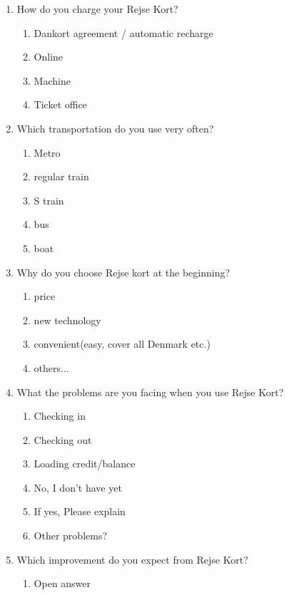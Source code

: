 \begin{enumerate}
\begin{enumerate}
\begin{enumerate}
			\item How do you charge your Rejse Kort?
				\begin{enumerate}
					\item Dankort agreement / automatic recharge
					\item Online
					\item Machine
					\item Ticket office
				\end{enumerate}
				
			\item Which transportation do you use very often?
				\begin{enumerate}
					\item Metro
					\item regular train
					\item S train
					\item bus
					\item boat
				\end{enumerate}
				
			\item Why do you choose Rejse kort at the beginning?
				\begin{enumerate}
					\item price
					\item new technology
					\item convenient(easy, cover all Denmark etc.)
					\item others...
				\end{enumerate}
				
			\item What the problems are you facing when you use Rejse Kort?
				\begin{enumerate}
					\item Checking in
					\item Checking out
					\item Loading credit/balance
					\item No, I don’t have yet
					\item If yes, Please explain
					\item Other problems?
				\end{enumerate}
				
			\item Which improvement  do you expect from Rejse Kort?
				\begin{enumerate}
					\item Open answer
				\end{enumerate}	
		\end{enumerate}%
		

\end{enumerate}
\end{enumerate}
